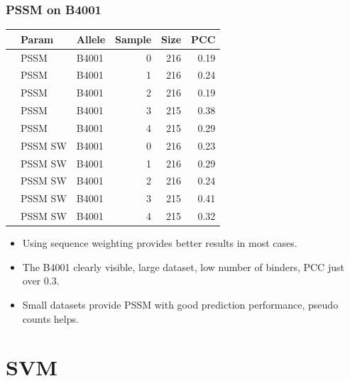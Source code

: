 \documentclass[presentation]{beamer}   %
\begin{document}
\begin{frame}
\frametitle{PSSM on B4001}
\begin{table}\scriptsize
\begin{center}
\begin{tabular}{rllrrr}
  \hline
 & Param & Allele & Sample & Size & PCC \\ 
  \hline
   & PSSM & B4001 &   0 & 216 & 0.19 \\ 
   & PSSM & B4001 &   1 & 216 & 0.24 \\ 
   & PSSM & B4001 &   2 & 216 & 0.19 \\ 
   & PSSM & B4001 &   3 & 215 & 0.38 \\ 
   & PSSM & B4001 &   4 & 215 & 0.29 \\ 
\hline
   & PSSM SW & B4001 &   0 & 216 & 0.23 \\ 
   & PSSM SW & B4001 &   1 & 216 & 0.29 \\ 
   & PSSM SW & B4001 &   2 & 216 & 0.24 \\ 
   & PSSM SW & B4001 &   3 & 215 & 0.41 \\ 
   & PSSM SW & B4001 &   4 & 215 & 0.32 \\ 
   \hline
\end{tabular}
\end{center}
\end{table}
\end{frame}

\begin{frame} 
\begin{itemize}
\item Using sequence weighting provides better results in most cases. \pause
\item The B4001 clearly visible, large dataset, low number of binders, PCC just over 0.3. \pause
\item Small datasets provide PSSM with good prediction performance, pseudo counts helps. \pause
\end{itemize}
\end{frame}

\section{SVM}
\end{document}
